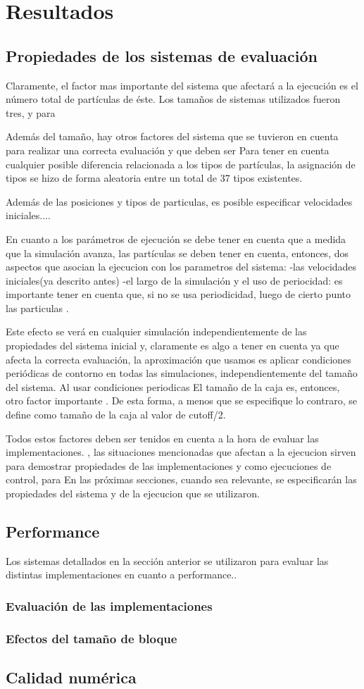 \chapter{Resultados}
\section{Propiedades de los sistemas de evaluación}
Claramente, el factor mas importante del sistema que afectará a la ejecución es el número total de partículas de éste. Los tamaños de sistemas utilizados fueron tres, y para 

Además del tamaño, hay otros factores del sistema que se tuvieron en cuenta para realizar una correcta evaluación y que deben ser 
Para tener en cuenta cualquier posible diferencia relacionada a los tipos de partículas, la asignación de tipos se hizo de forma aleatoria entre un total de 37 tipos existentes.

Además de las posiciones y tipos de particulas, es posible especificar velocidades iniciales....

En cuanto a los parámetros de ejecución se debe tener en cuenta que a medida que la simulación avanza, las partículas 
se deben tener en cuenta, entonces, dos aspectos que asocian la ejecucion con los parametros del sistema:
-las velocidades iniciales(ya descrito antes)
-el largo de la simulación y el uso de periocidad: es importante tener en cuenta que, si no se usa periodicidad, luego de cierto punto las particulas . 

Este efecto se verá en cualquier simulación independientemente de las propiedades del sistema inicial y, claramente es algo a tener en cuenta ya que afecta la correcta evaluación, la aproximación que usamos es aplicar condiciones periódicas de contorno en todas las simulaciones, independientemente del tamaño del sistema.
Al usar condiciones periodicas 
El tamaño de la caja es, entonces, otro factor importante . De esta forma, a menos que se especifique lo contraro, se define como tamaño de la caja al valor de cutoff/2.

Todos estos factores deben ser tenidos en cuenta a la hora de evaluar las implementaciones. 
, las situaciones mencionadas que afectan a la ejecucion sirven para demostrar propiedades de las implementaciones y como ejecuciones de control, para 
En las próximas secciones, cuando sea relevante, se especificarán las propiedades del sistema y de la ejecucion que se utilizaron.


\section{Performance}
Los sistemas detallados en la sección anterior se utilizaron para evaluar las distintas implementaciones en cuanto a performance..

\subsection{Evaluación de las implementaciones}
\subsection{Efectos del tamaño de bloque}
\section{Calidad numérica}

